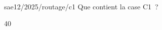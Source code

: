 \begin{question}{sae12/2025/routage/c1}
  Que contient la case C1~?
  \begin{reponses}{4}{0}
  \end{reponses}
\end{question}
